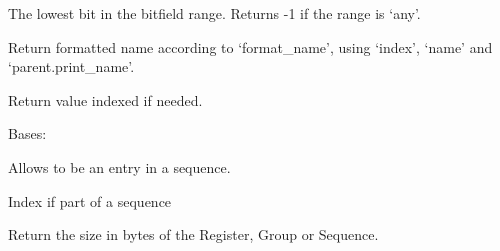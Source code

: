 \documentclass[letterpaper,10pt,english]{sphinxmanual}
\begin{document}
\begin{fulllineitems}
\begin{fulllineitems}
\label{\detokenize{developer:wuppercodegen.classes.BitField.lo}}
The lowest bit in the bitfield range. Returns -1 if the range is `any'.

\end{fulllineitems}


\begin{fulllineitems}
\label{\detokenize{developer:wuppercodegen.classes.BitField.print_name}}
Return formatted name according to `format\_name', using `index', `name' and `parent.print\_name'.

\end{fulllineitems}


\begin{fulllineitems}
\label{\detokenize{developer:wuppercodegen.classes.BitField.value_string}}
Return value indexed if needed.

\end{fulllineitems}


\end{fulllineitems}


\begin{fulllineitems}
\label{\detokenize{developer:wuppercodegen.classes.Entry}}
Bases: {\hyperref[\detokenize{developer:wuppercodegen.classes.Node}]{}}

Allows to be an entry in a sequence.

\begin{fulllineitems}
\label{\detokenize{developer:wuppercodegen.classes.Entry.index}}
Index if part of a sequence

\end{fulllineitems}


\begin{fulllineitems}
\label{\detokenize{developer:wuppercodegen.classes.Entry.size}}
Return the size in bytes of the Register, Group or Sequence.

\end{fulllineitems}


\end{fulllineitems}
\end{document}
